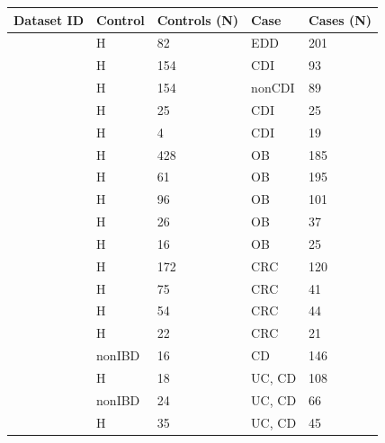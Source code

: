 \begin{table}[hbtp!]
    \centering
    \begin{tabular}{l l p{} l p{}}
    \toprule
       Dataset ID & Control & Controls (N) & Case & Cases (N)\\
       \midrule
        \cite{edd-singh} & \acrshort{H} & 82 & \acrshort{EDD} & 201 \\
        \cite{cdi-schubert} & \acrshort{H} & 154 & \acrshort{CDI} & 93 \\
        \cite{cdi-schubert} & \acrshort{H} & 154 & \acrshort{nonCDI} & 89 \\
        \cite{cdi-vincent} & \acrshort{H} & 25 & \acrshort{CDI} & 25 \\
        \cite{cdi-youngster} & \acrshort{H} & 4 & \acrshort{CDI} & 19 \\
        \cite{ob-goodrich} & \acrshort{H} & 428 & \acrshort{OB} & 185 \\
        \cite{ob-turnbaugh} & \acrshort{H} & 61 & \acrshort{OB} & 195 \\
        \cite{ob-zupancic} & \acrshort{H} & 96 & \acrshort{OB} & 101 \\
        \cite{ob-ross} & \acrshort{H} & 26 & \acrshort{OB} & 37 \\
        \cite{nash-zhu} & \acrshort{H} & 16 & \acrshort{OB} & 25 \\
        \cite{crc-baxter} & \acrshort{H} & 172 & \acrshort{CRC} & 120 \\
        \cite{crc-zeller} & \acrshort{H} & 75 & \acrshort{CRC} & 41 \\
        \cite{crc-zhaowang} & \acrshort{H} & 54 & \acrshort{CRC} & 44 \\
        \cite{crc-chen} & \acrshort{H} & 22 & \acrshort{CRC} & 21 \\
        \cite{ibd-gevers} & \acrshort{nonIBD} & 16 & \acrshort{CD} & 146 \\
        \cite{ibd-morgan} & \acrshort{H} & 18 & \acrshort{UC}, \acrshort{CD} & 108 \\
        \cite{ibd-papa} & \acrshort{nonIBD} & 24 & \acrshort{UC}, \acrshort{CD} & 66 \\
        \cite{ibd-willing} & \acrshort{H} & 35 & \acrshort{UC}, \acrshort{CD} & 45 \\

\end{tabular}
\end{table}
